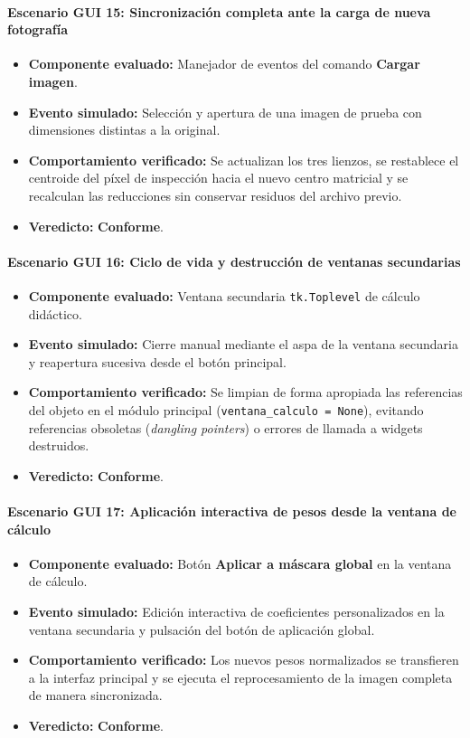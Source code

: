 \documentclass[11pt]{article}
\newcommand{\pruebaok}{\textcolor{verdeExito}{\textbf{Conforme}}}
\begin{document}
\paragraph{Escenario GUI 15: Sincronización completa ante la carga de nueva fotografía}
\begin{itemize}[itemsep=0.15em]
\item \textbf{Componente evaluado:} Manejador de eventos del comando \textbf{Cargar imagen}.
\item \textbf{Evento simulado:} Selección y apertura de una imagen de prueba con dimensiones distintas a la original.
\item \textbf{Comportamiento verificado:} Se actualizan los tres lienzos, se restablece el centroide del píxel de inspección hacia el nuevo centro matricial y se recalculan las reducciones sin conservar residuos del archivo previo.
\item \textbf{Veredicto:} \pruebaok.
\end{itemize}

\paragraph{Escenario GUI 16: Ciclo de vida y destrucción de ventanas secundarias}
\begin{itemize}[itemsep=0.15em]
\item \textbf{Componente evaluado:} Ventana secundaria \texttt{tk.Toplevel} de cálculo didáctico.
\item \textbf{Evento simulado:} Cierre manual mediante el aspa de la ventana secundaria y reapertura sucesiva desde el botón principal.
\item \textbf{Comportamiento verificado:} Se limpian de forma apropiada las referencias del objeto en el módulo principal (\texttt{ventana\_calculo = None}), evitando referencias obsoletas (\textit{dangling pointers}) o errores de llamada a widgets destruidos.
\item \textbf{Veredicto:} \pruebaok.
\end{itemize}

\paragraph{Escenario GUI 17: Aplicación interactiva de pesos desde la ventana de cálculo}
\begin{itemize}[itemsep=0.15em]
\item \textbf{Componente evaluado:} Botón \textbf{Aplicar a máscara global} en la ventana de cálculo.
\item \textbf{Evento simulado:} Edición interactiva de coeficientes personalizados en la ventana secundaria y pulsación del botón de aplicación global.
\item \textbf{Comportamiento verificado:} Los nuevos pesos normalizados se transfieren a la interfaz principal y se ejecuta el reprocesamiento de la imagen completa de manera sincronizada.
\item \textbf{Veredicto:} \pruebaok.
\end{itemize}
\end{document}
